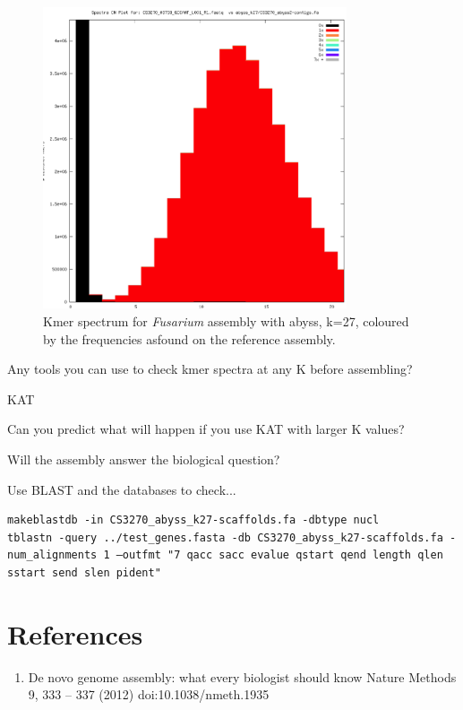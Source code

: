 \begin{figure}[H]
\centering
\includegraphics[width=0.8\textwidth]{handout/abyss-k27.png}
\caption{Kmer spectrum for \textit{Fusarium} assembly with abyss, k=27, coloured by the frequencies asfound on the reference assembly.}
\label{fig:fusariumk27}
\end{figure}

\begin{questions}
Any tools you can use to check kmer spectra at any K before assembling? \\
\begin{answer}
KAT \\
\end{answer}
Can you predict what will happen if you use KAT with larger K values? \\
\begin{answer}
\end{answer}
\end{questions}

\begin{steps}
Will the assembly answer the biological question?

Use BLAST and the databases to check...
\begin{lstlisting}
makeblastdb -in CS3270_abyss_k27-scaffolds.fa -dbtype nucl
tblastn -query ../test_genes.fasta -db CS3270_abyss_k27-scaffolds.fa -num_alignments 1 –outfmt "7 qacc sacc evalue qstart qend length qlen sstart send slen pident"
\end{lstlisting}

\end{steps}

\section{References}
\begin{enumerate}
  \item De novo genome assembly: what every biologist should know Nature Methods 9, 333 – 337 (2012) doi:10.1038/nmeth.1935 
\end{enumerate}
